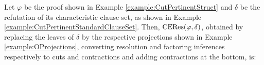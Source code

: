 \documentclass{llncs}
\begin{document}
\begin{remark}
\end{remark}


\begin{landscape}
\begin{example}
\label{example:CEResSONormalForm}
Let $\varphi$ be the proof shown in Example \ref{example:CutPertinentStruct} and $\delta$ be the refutation of its characteristic clause set, as shown in Example \ref{example:CutPertinentStandardClauseSet}. Then, $\mathrm{CERes}(\varphi,\delta)$, obtained by replacing the leaves of $\delta$ by the respective projections shown in Example \ref{example:OProjections}, converting resolution and factoring inferences respectively to cuts and contractions and adding contractions at the bottom, is:


\end{example}
\end{landscape}
\end{document}
